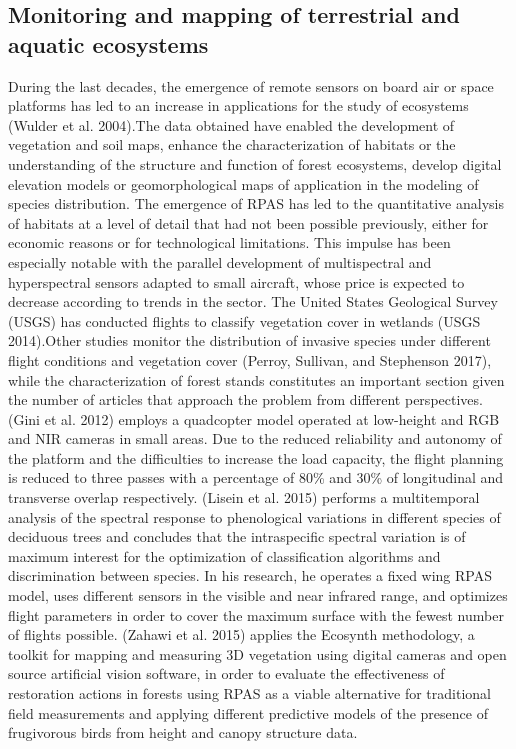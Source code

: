\documentclass[]{interact}
\theoremstyle{plain}%
\theoremstyle{definition}
\theoremstyle{remark}
\begin{document}
\subsection{Monitoring and mapping of terrestrial and aquatic
ecosystems}\label{monitoring-and-mapping-of-terrestrial-and-aquatic-ecosystems}

During the last decades, the emergence of remote sensors on board air or
space platforms has led to an increase in applications for the study of
ecosystems (Wulder et al. 2004).The data obtained have enabled the
development of vegetation and soil maps, enhance the characterization of
habitats or the understanding of the structure and function of forest
ecosystems, develop digital elevation models or geomorphological maps of
application in the modeling of species distribution. The emergence of
RPAS has led to the quantitative analysis of habitats at a level of
detail that had not been possible previously, either for economic
reasons or for technological limitations. This impulse has been
especially notable with the parallel development of multispectral and
hyperspectral sensors adapted to small aircraft, whose price is expected
to decrease according to trends in the sector. The United States
Geological Survey (USGS) has conducted flights to classify vegetation
cover in wetlands (USGS 2014).Other studies monitor the distribution of
invasive species under different flight conditions and vegetation cover
(Perroy, Sullivan, and Stephenson 2017), while the characterization of
forest stands constitutes an important section given the number of
articles that approach the problem from different perspectives. (Gini et
al. 2012) employs a quadcopter model operated at low-height and RGB and
NIR cameras in small areas. Due to the reduced reliability and autonomy
of the platform and the difficulties to increase the load capacity, the
flight planning is reduced to three passes with a percentage of 80\% and
30\% of longitudinal and transverse overlap respectively. (Lisein et al.
2015) performs a multitemporal analysis of the spectral response to
phenological variations in different species of deciduous trees and
concludes that the intraspecific spectral variation is of maximum
interest for the optimization of classification algorithms and
discrimination between species. In his research, he operates a fixed
wing RPAS model, uses different sensors in the visible and near infrared
range, and optimizes flight parameters in order to cover the maximum
surface with the fewest number of flights possible. (Zahawi et al. 2015)
applies the Ecosynth methodology, a toolkit for mapping and measuring 3D
vegetation using digital cameras and open source artificial vision
software, in order to evaluate the effectiveness of restoration actions
in forests using RPAS as a viable alternative for traditional field
measurements and applying different predictive models of the presence of
frugivorous birds from height and canopy structure data.
\end{document}
